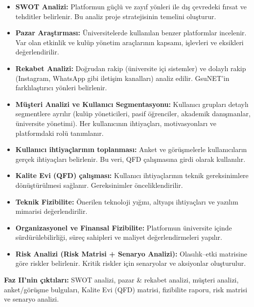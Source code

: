 \documentclass[a4paper,12pt]{report}
\begin{document}
\begin{itemize}
    \item \textbf{SWOT Analizi:} Platformun güçlü ve zayıf yönleri ile dış çevredeki fırsat ve tehditler belirlenir. Bu analiz proje stratejisinin temelini oluşturur.

    \item \textbf{Pazar Araştırması:} Üniversitelerde kullanılan benzer platformlar incelenir. Var olan etkinlik ve kulüp yönetim araçlarının kapsamı, işlevleri ve eksikleri değerlendirilir.

    \item \textbf{Rekabet Analizi:} Doğrudan rakip (üniversite içi sistemler) ve dolaylı rakip (Instagram, WhatsApp gibi iletişim kanalları) analiz edilir. GsuNET'in farklılaştırıcı yönleri belirlenir.

    \item \textbf{Müşteri Analizi ve Kullanıcı Segmentasyonu:} Kullanıcı grupları detaylı segmentlere ayrılır (kulüp yöneticileri, pasif öğrenciler, akademik danışmanlar, üniversite yönetimi). Her kullanıcının ihtiyaçları, motivasyonları ve platformdaki rolü tanımlanır.

    \item \textbf{Kullanıcı ihtiyaçlarının toplanması:} Anket ve görüşmelerle kullanıcıların gerçek ihtiyaçları belirlenir. Bu veri, QFD çalışmasına girdi olarak kullanılır.

    \item \textbf{Kalite Evi (QFD) çalışması:} Kullanıcı ihtiyaçlarının teknik gereksinimlere dönüştürülmesi sağlanır. Gereksinimler önceliklendirilir.

    \item \textbf{Teknik Fizibilite:} Önerilen teknoloji yığını, altyapı ihtiyaçları ve yazılım mimarisi değerlendirilir.

    \item \textbf{Organizasyonel ve Finansal Fizibilite:} Platformun üniversite içinde sürdürülebilirliği, süreç sahipleri ve maliyet değerlendirmeleri yapılır.

    \item \textbf{Risk Analizi (Risk Matrisi + Senaryo Analizi):} Olasılık–etki matrisine göre riskler belirlenir. Kritik riskler için senaryolar ve aksiyonlar oluşturulur.
\end{itemize}

\textbf{Faz II'nin çıktıları:} SWOT analizi, pazar \& rekabet analizi, müşteri analizi, anket/görüşme bulguları, Kalite Evi (QFD) matrisi, fizibilite raporu, risk matrisi ve senaryo analizi.
\end{document}
